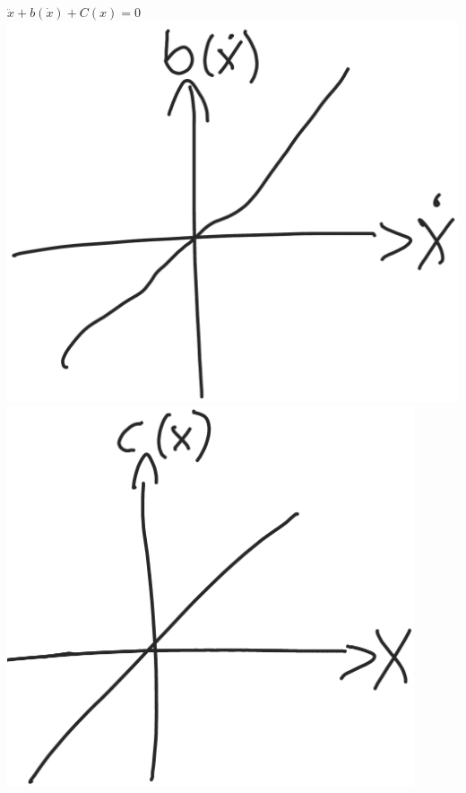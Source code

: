 \documentclass{beamer}
\begin{document}
\begin{frame}{ex}
    \begin{columns}[T]
        $\ddot{x}+b(\dot{x})+C(x)=0$\\
        \vspace{1cm}
        \includegraphics[width=\textwidth]{fig/bx.png}   
        \vspace{1cm}
        \includegraphics[width=0.9\textwidth]{fig/cx.png}   
    \end{columns}
\end{frame}
\end{document}
